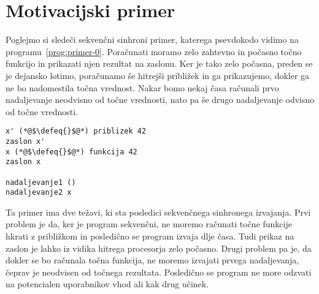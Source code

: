 \section{Motivacijski primer} \label{sec:primeri-aeff}

Poglejmo si sledeči sekvenčni sinhroni primer, katerega psevdokodo vidimo na programu~\ref{prog:primer-0}. Poračunati moramo zelo zahtevno in počasno točno funkcijo in prikazati njen rezultat na zaslonu. Ker je tako zelo počasna, preden se je dejansko lotimo, poračunamo še hitrejši približek in ga prikazujemo, dokler ga ne bo nadomestila točna vrednost. Nakar bomo nekaj časa računali prvo nadaljevanje neodvisno od točne vrednosti, nato pa še drugo nadaljevanje odvisno od točne vrednosti. 

\begin{lstlisting}[caption={Sinhron sekvečni primer.},label={prog:primer-0},float,floatplacement=H]
x' (*@$\defeq{}$@*) priblizek 42
zaslon x'
x (*@$\defeq{}$@*) funkcija 42
zaslon x

nadaljevanje1 ()
nadaljevanje2 x
\end{lstlisting}

Ta primer ima dve težavi, ki sta posledici sekvenčnega sinhronega izvajanja. Prvi problem je da, ker je program sekvenčni, ne moremo računati točne funkcije hkrati z približkom in posledično se program izvaja dlje časa. Tudi prikaz na zaslon je lahko iz vidika hitrega procesorja zelo počasno. Drugi problem pa je, da dokler se bo računala točna funkcija, ne moremo izvajati prvega nadaljevanja, čeprav je neodvisen od točnega rezultata. Posledično se program ne more odzvati na potencialen uporabnikov vhod ali kak drug učinek.  

